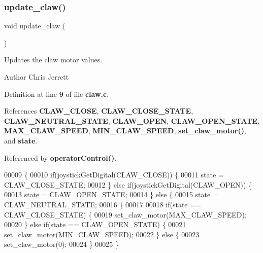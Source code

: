 \subsubsection{update\+\_\+claw()}
{\footnotesize\ttfamily void update\+\_\+claw (\begin{DoxyParamCaption}{ }\end{DoxyParamCaption})}



Updates the claw motor values. 

\begin{DoxyAuthor}{Author}
Chris Jerrett 
\end{DoxyAuthor}


Definition at line \textbf{ 9} of file \textbf{ claw.\+c}.



References \textbf{ C\+L\+A\+W\+\_\+\+C\+L\+O\+SE}, \textbf{ C\+L\+A\+W\+\_\+\+C\+L\+O\+S\+E\+\_\+\+S\+T\+A\+TE}, \textbf{ C\+L\+A\+W\+\_\+\+N\+E\+U\+T\+R\+A\+L\+\_\+\+S\+T\+A\+TE}, \textbf{ C\+L\+A\+W\+\_\+\+O\+P\+EN}, \textbf{ C\+L\+A\+W\+\_\+\+O\+P\+E\+N\+\_\+\+S\+T\+A\+TE}, \textbf{ M\+A\+X\+\_\+\+C\+L\+A\+W\+\_\+\+S\+P\+E\+ED}, \textbf{ M\+I\+N\+\_\+\+C\+L\+A\+W\+\_\+\+S\+P\+E\+ED}, \textbf{ set\+\_\+claw\+\_\+motor()}, and \textbf{ state}.



Referenced by \textbf{ operator\+Control()}.


\begin{DoxyCode}
00009                    \{
00010   \textcolor{keywordflow}{if}(joystickGetDigital(CLAW_CLOSE)) \{
00011     state = CLAW_CLOSE_STATE;
00012   \} \textcolor{keywordflow}{else} \textcolor{keywordflow}{if}(joystickGetDigital(CLAW_OPEN)) \{
00013     state = CLAW_OPEN_STATE;
00014   \} \textcolor{keywordflow}{else} \{
00015     state = CLAW_NEUTRAL_STATE;
00016   \}
00017 
00018   \textcolor{keywordflow}{if}(state == CLAW_CLOSE_STATE) \{
00019     set_claw_motor(MAX_CLAW_SPEED);
00020   \} \textcolor{keywordflow}{else} \textcolor{keywordflow}{if}(state == CLAW_OPEN_STATE) \{
00021     set_claw_motor(MIN_CLAW_SPEED);
00022   \} \textcolor{keywordflow}{else} \{
00023     set_claw_motor(0);
00024   \}
00025 \}
\end{DoxyCode}
